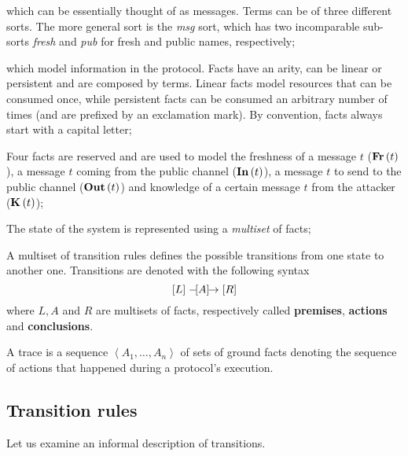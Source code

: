 \begin{description}[style=nextline]
    \item[Terms] which can be essentially thought of as messages. Terms can be of three different sorts. The more general sort is the \textit{msg} sort, which has two incomparable sub-sorts \textit{fresh} and \textit{pub} for fresh and public names, respectively;
    \item[Facts] which model information in the protocol. Facts have an arity, can be linear or persistent and are composed by terms. Linear facts model resources that can be consumed once, while persistent facts can be consumed an arbitrary number of times (and are prefixed by an exclamation mark). By convention, facts always start with a capital letter;
    \item[Special facts] Four facts are reserved and are used to model the freshness of a message $t$ ($\mbox{\textbf{Fr}}\left(t\right)$), a message $t$ coming from the public channel ($\mbox{\textbf{In}}\left(t\right)$), a message $t$ to send to the public channel ($\mbox{\textbf{Out}}\left(t\right)$) and knowledge of a certain message $t$ from the attacker ($\mbox{\textbf{K}}\left(t\right)$);
    \item[State of the system] The state of the system is represented using a \textit{multiset} of facts;
    \item[Transition rules] A multiset of transition rules defines the possible transitions from one state to another one. Transitions are denoted with the following syntax
        \begin{equation}
            [L] \mathrel{-\hspace{-2pt}[A]\hspace{-4pt}\to} [R]
        \end{equation}
        where $L, A$ and $R$ are multisets of facts, respectively called \textbf{premises}, \textbf{actions} and \textbf{conclusions}.
    \item[Trace] A trace is a sequence $\left<A_1, \ldots, A_n\right>$ of sets of ground facts denoting the sequence of actions that happened during a protocol's execution.
\end{description}


\subsection{Transition rules}
\label{sub:Transition-rules}
Let us examine an informal description of transitions.

